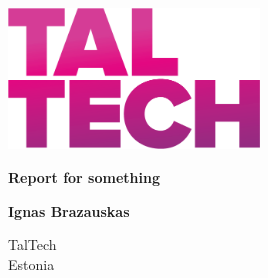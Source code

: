 \begin{titlepage}
    \begin{center}
        
        
        \includegraphics[width=0.5\textwidth]{dependancies/TTU_logo_fixed2.png}
        \vspace*{1cm}
        
        {
            \Large 
            \textbf{Report for something}
        }

        \vspace{1.5cm}
        {
            \large
            \textbf{Ignas Brazauskas} \\
        }
        \vfill


        \vspace{0.8cm}

        

        TalTech\\
        Estonia\\
        \the\year{}

    \end{center}
\end{titlepage}